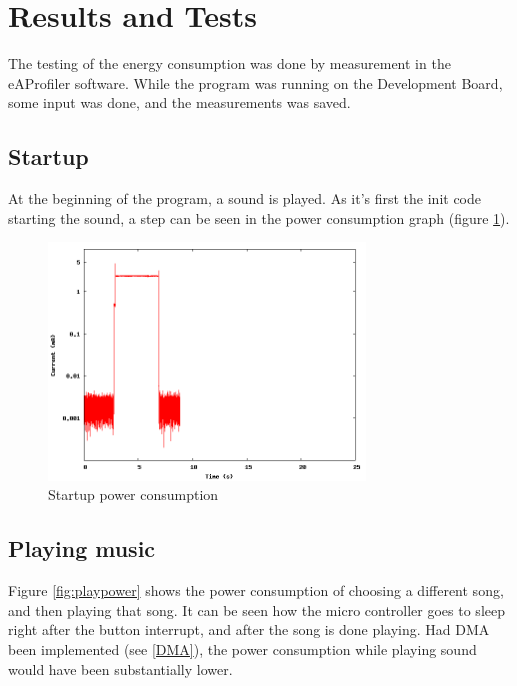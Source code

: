 \section{Results and Tests}

The testing of the energy consumption was done by measurement in the eAProfiler software.
While the program was running on the Development Board, some input was done, and the measurements was saved.

\subsection{Startup}

At the beginning of the program, a sound is played. 
As it's first the init code starting the sound, a step can be seen in the power consumption graph (figure \ref{fig:startuppower}).
\begin{figure}[H]
\centering
\includegraphics[width=0.75\textwidth]{data/startup.png}
\caption{Startup power consumption}
\label{fig:startuppower}
\end{figure}

\subsection{Playing music}
Figure \ref{fig:playpower} shows the power consumption of choosing a different song, and then playing that song.
It can be seen how the micro controller goes to sleep right after the button interrupt, and after the song is done playing.
Had DMA been implemented (see \vref{DMA}), the power consumption while playing sound would have been substantially lower.

